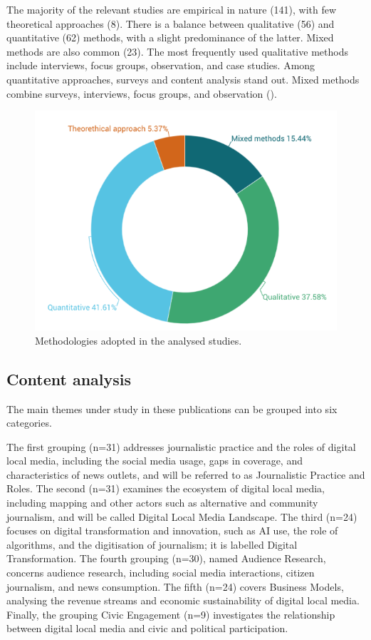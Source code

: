 \documentclass[english]{textolivre}
\begin{document}
The majority of the relevant studies are empirical in nature (141), with few theoretical approaches (8). There is a balance between qualitative (56) and quantitative (62) methods, with a slight predominance of the latter. Mixed methods are also common (23). The most frequently used qualitative methods include interviews, focus groups, observation, and case studies. Among quantitative approaches, surveys and content analysis stand out. Mixed methods combine surveys, interviews, focus groups, and observation ().

\begin{figure}[htbp]
\centering
\begin{minipage}{0.70\textwidth}
\includegraphics[width =\textwidth]{Imagens/Fig4.png}
\caption{Methodologies adopted in the analysed studies.}
\label{fig-4}
\end{minipage}
\end{figure}

\subsection{Content analysis}
The main themes under study in these publications can be grouped into six categories.

The first grouping (n=31) addresses journalistic practice and the roles of digital local media, including the social media usage, gaps in coverage, and characteristics of news outlets, and will be referred to as Journalistic Practice and Roles. The second (n=31) examines the ecosystem of digital local media, including mapping and other actors such as alternative and community journalism, and will be called Digital Local Media Landscape. The third (n=24) focuses on digital transformation and innovation, such as AI use, the role of algorithms, and the digitisation of journalism; it is labelled Digital Transformation. The fourth grouping (n=30), named Audience Research, concerns audience research, including social media interactions, citizen journalism, and news consumption. The fifth (n=24) covers Business Models, analysing the revenue streams and economic sustainability of digital local media. Finally, the grouping Civic Engagement (n=9) investigates the relationship between digital local media and civic and political participation.
\end{document}
